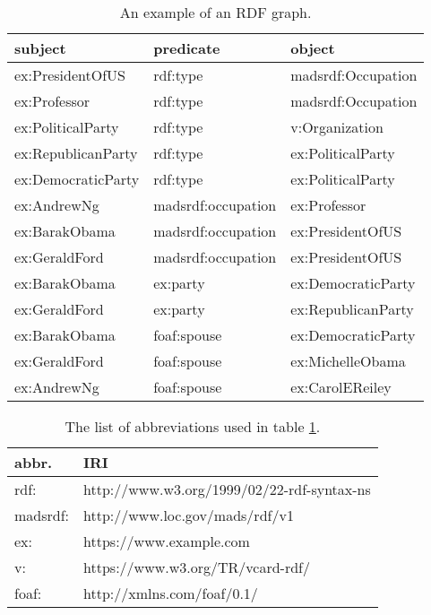 \begin{table}[h]
	\centering
	\begin{tabular}{lll}
		\textbf{subject} & \textbf{predicate} & \textbf{object} \\ \hline
		ex:PresidentOfUS          &        rdf:type            &        madsrdf:Occupation       \\
		ex:Professor          &        rdf:type            &        madsrdf:Occupation       \\
		ex:PoliticalParty			&          rdf:type          &          v:Organization     \\
		ex:RepublicanParty			&          rdf:type          &          ex:PoliticalParty     \\
		ex:DemocraticParty			&          rdf:type          &          ex:PoliticalParty     \\
		ex:AndrewNg          &        madsrdf:occupation           &      ex:Professor         \\
		ex:BarakObama          &        madsrdf:occupation           &       ex:PresidentOfUS         \\
		ex:GeraldFord          &        madsrdf:occupation           &       ex:PresidentOfUS         \\
		ex:BarakObama          &        ex:party           &       ex:DemocraticParty	         \\
		ex:GeraldFord          &        ex:party           &       ex:RepublicanParty         \\
		ex:BarakObama          &        foaf:spouse           &       ex:DemocraticParty	         \\
		ex:GeraldFord          &        foaf:spouse           &       ex:MichelleObama         \\
		ex:AndrewNg          &        foaf:spouse           &       ex:CarolEReiley         \\
	\end{tabular}
	\caption{An example of an RDF graph.}
	\label{tab:rdf_graph_example}
\end{table}


\begin{table}[h]
	\centering
	\begin{tabular}{ll}
		\textbf{abbr.} & \textbf{IRI}  \\ \hline
		rdf:         &        http://www.w3.org/1999/02/22-rdf-syntax-ns       \\
		madsrdf:          &        	http://www.loc.gov/mads/rdf/v1                 \\
		ex:			&          https://www.example.com            \\
		v:			&          https://www.w3.org/TR/vcard-rdf/          \\
		foaf:			&         http://xmlns.com/foaf/0.1/           \\
	\end{tabular}
	\caption{The list of abbreviations used in table \ref{tab:rdf_graph_example}.}
	\label{tab:rdf_graph_abbr}
\end{table}


